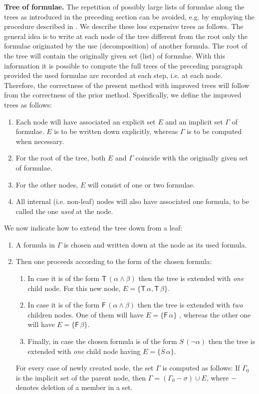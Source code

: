 \documentclass[a4paper,UKenglish]{lipics}
\newcounter{c}
\newcommand{\nentry}[1]{\noindent\textbf{#1}}
\newcommand{\sg}[1]{\textsf{#1}}
\newcommand{\op}[1]{\ensuremath{\overline{#1}}}
\begin{document}
\nentry{Tree of formulae.}
The repetition of possibly large lists of formulae along the trees as introduced in the preceding section can be avoided, e.g. by employing the procedure described in \cite{Smullyan}. We describe these less expensive trees as follows. 
The general idea is to write at each node of the tree different from the root only the formulae originated by the use (decomposition) of another formula. The root of the tree will contain the originally given set (list) of formulae. With this information it is possible to compute the full trees of the preceding paragraph provided the used formulae are recorded at each step, i.e. at each node. Therefore, the correctness of the present method with improved trees will follow from the correctness of the prior method. 
Specifically, we define the improved trees as follows:\begin{enumerate}
\item Each node will have associated an explicit set $E$ 
 and an implicit set $\Gamma$ of formulae. $E$ is to be written down explicitly, whereas $\Gamma$ is to be computed when necessary.
\item For the root of the tree, both $E$ and $\Gamma$ coincide with the originally given set of formulae.
\item For the other nodes, $E$ will consist of one or two formulae.
\item All internal (i.e. non-leaf) nodes will also have associated one formula, to be called the one \textit{used} at the node.
\end{enumerate}
We now indicate how to extend the tree down from a leaf:
\begin{enumerate}
\item A formula in $\Gamma$ is chosen and written down at the node as its used formula.
\item Then one proceeds according to the form of the chosen formula:
\begin{enumerate}
\item In case it is of the form $\sg{T}\,(\alpha\wedge\beta)$ then the tree is extended with \emph{one} child node. For this new node, $E = \{\sg{T}\,\alpha , \sg{T}\,\beta\}$. \item In case it is of the form $\sg{F}\,(\alpha\wedge\beta)$ then the tree is extended with \emph{two} children nodes. One of them will have $E = \{\sg{F}\,\alpha\}$ , whereas the other one will have $E = \{\sg{F}\,\beta\}$.
\item Finally, in case the chosen formula is of the form $S\,(\neg\alpha)$ then the tree is extended with \emph{one} child node having $E = \{\op{S}\,\alpha\}$.
\end{enumerate}
For every case of newly created node, the set $\Gamma$ is computed as follows: If  $\Gamma_{0}$ is the implicit set of the parent node, then $\Gamma = (\Gamma_{0} - \sigma) \cup E$, where $-$ denotes deletion of a member in a set.
\end{enumerate}
\end{document}
